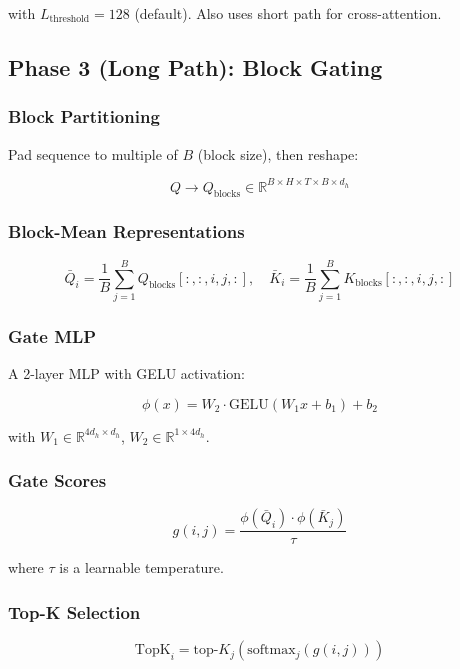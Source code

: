 with $L_\text{threshold} = 128$ (default). Also uses short path for 
cross-attention.

\subsection{Phase 3 (Long Path): Block Gating}

\subsubsection{Block Partitioning}

Pad sequence to multiple of $B$ (block size), then reshape:

\[
Q \to Q_\text{blocks} \in \mathbb{R}^{B \times H \times T \times B \times d_h}
\tag{4.3}
\]

\subsubsection{Block-Mean Representations}

\[
\bar{Q}_i = \frac{1}{B} \sum_{j=1}^{B} Q_\text{blocks}[:, :, i, j, :], \quad
\bar{K}_i = \frac{1}{B} \sum_{j=1}^{B} K_\text{blocks}[:, :, i, j, :]
\tag{4.4}
\]

\subsubsection{Gate MLP}

A 2-layer MLP with GELU activation:

\[
\phi(x) = W_2 \cdot \text{GELU}(W_1 x + b_1) + b_2
\tag{4.5}
\]

with $W_1 \in \mathbb{R}^{4 d_h \times d_h}$, $W_2 \in \mathbb{R}^{1 \times 4 d_h}$.

\subsubsection{Gate Scores}

\[
g(i, j) = \frac{\phi(\bar{Q}_i) \cdot \phi(\bar{K}_j)}{\tau}
\tag{4.6}
\]

where $\tau$ is a learnable temperature.

\subsubsection{Top-K Selection}

\[
\text{TopK}_i = \text{top-}K_{j}(\text{softmax}_j(g(i, j)))
\tag{4.7}
\]

